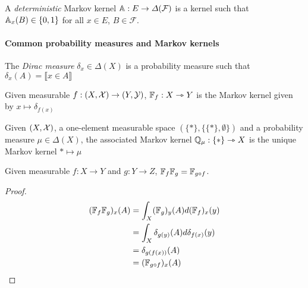 \begin{definition}
A \emph{deterministic} Markov kernel $\mathbb{A}:E\to \Delta(\mathcal{F})$ is a kernel such that $\mathbb{A}_x(B)\in\{0,1\}$ for all $x\in E$, $B\in\mathcal{F}$.
\end{definition}

\paragraph{Common probability measures and Markov kernels}

\begin{definition}
The \emph{Dirac measure} $\delta_x\in \Delta(X)$ is a probability measure such that $\delta_x(A)=\llbracket x\in A \rrbracket$
\end{definition}

\begin{definition}
Given measurable $f:(X,\mathcal{X})\to (Y,\mathcal{Y})$, $\mathbb{F}_f:X\rightarrowtriangle Y$ is the Markov kernel given by $x\mapsto \delta_{f(x)}$
\end{definition}

\begin{definition}
Given $(X,\mathcal{X})$, a one-element measurable space $(\{*\},\{\{*\},\emptyset\})$ and a probability measure $\mu\in \Delta(X)$, the associated Markov kernel $\mathbb{Q}_\mu:\{*\}\rightarrowtriangle X$ is the unique Markov kernel $*\mapsto \mu$
\end{definition}

\begin{lemma}\label{lem:func_kern_product}
Given measurable $f:X\to Y$ and $g:Y\to Z$, $\mathbb{F}_f\mathbb{F}_g = \mathbb{F}_{g\circ f}$.
\end{lemma}

\begin{proof}
\begin{align}
    (\mathbb{F}_{f}\mathbb{F}_g)_x(A) &= \int_X (\mathbb{F}_g)_y(A) d(\mathbb{F}_f)_x(y)\\
                                      &= \int_X \delta_{g(y)}(A) d\delta_{f(x)}(y)\\
                                      &= \delta_{g(f(x))} (A)\\
                                      &= (\mathbb{F}_{g\circ f})_x(A) 
\end{align}
\end{proof}

